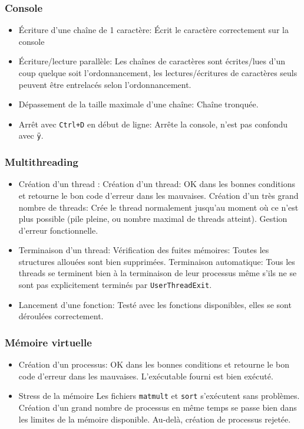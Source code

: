 \documentclass{article}
\begin{document}
		\subsubsection{Console}
			\begin{itemize}
				\item Écriture d'une chaîne de 1 caractère: Écrit le caractère correctement sur la console
				\item Écriture/lecture parallèle: Les chaînes de caractères sont écrites/lues d'un coup quelque soit l'ordonnancement, les lectures/écritures de caractères seuls peuvent être entrelacés selon l'ordonnancement.
				\item Dépassement de la taille maximale d'une chaîne: Chaîne tronquée.
				\item Arrêt avec \texttt{Ctrl+D} en début de ligne: Arrête la console, n'est pas confondu avec \texttt{ÿ}.
			\end{itemize}

		\subsubsection{Multithreading}
			\begin{itemize}
				\item Création d'un thread :
					\subitem Création d'un thread: OK dans les bonnes conditions et retourne le bon code d'erreur dans les mauvaises.
					\subitem Création d'un très grand nombre de threads: Crée le thread normalement jusqu'au moment où ce n'est plus possible (pile pleine, ou nombre maximal de threads atteint). Gestion d'erreur fonctionnelle.
				\item Terminaison d'un thread:
					\subitem Vérification des fuites mémoires: Toutes les structures allouées sont bien supprimées.
					\subitem Terminaison automatique: Tous les threads se terminent bien à la terminaison de leur processus même s'ils ne se sont pas explicitement terminés par \texttt{UserThreadExit}.
				\item Lancement d'une fonction: Testé avec les fonctions disponibles, elles se sont déroulées correctement.
			\end{itemize}

		\subsubsection{Mémoire virtuelle}
			\begin{itemize}
				\item Création d'un processus: OK dans les bonnes conditions et retourne le bon code d'erreur dans les mauvaises.
					\subitem L'exécutable fourni est bien exécuté.
				\item Stress de la mémoire
					\subitem Les fichiers \texttt{matmult} et \texttt{sort} s'exécutent sans problèmes.
					\subitem Création d'un grand nombre de processus en même temps se passe bien dans les limites de la mémoire disponible. Au-delà, création de processus rejetée.
				
			\end{itemize}
\end{document}
